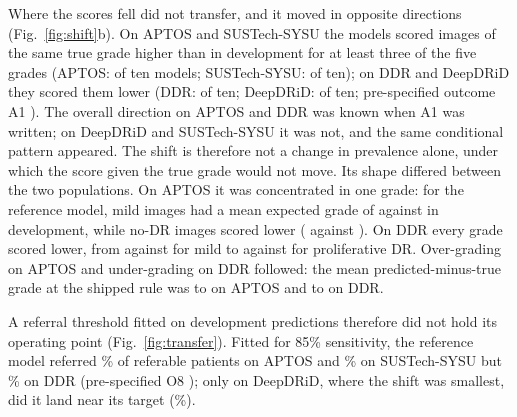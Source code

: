 Where the scores fell did not transfer, and it moved in opposite directions
(Fig.~\ref{fig:shift}b). On APTOS and SUSTech-SYSU the models scored images of the same true grade
higher than in development for at least three of the five grades (APTOS: 
of ten models; SUSTech-SYSU:  of ten); on DDR and DeepDRiD they scored them
lower (DDR:  of ten; DeepDRiD:  of ten; pre-specified
outcome A1 ). The overall direction on APTOS and DDR was known when A1 was written; on DeepDRiD
and SUSTech-SYSU it was not, and the same conditional pattern appeared. The shift is therefore not a
change in prevalence alone, under which the score given the true grade would not move. Its shape differed between the two populations. On
APTOS it was concentrated in one grade: for the reference model, mild images had a mean expected
grade of  against  in development, while no-DR images
scored lower ( against ). On DDR every grade scored lower,
from  against  for mild to  against
 for proliferative DR. Over-grading on APTOS and under-grading on DDR followed:
the mean predicted-minus-true grade at the shipped rule was  to
 on APTOS and  to  on DDR.

A referral threshold fitted on development predictions therefore did not hold its operating
point (Fig.~\ref{fig:transfer}). Fitted for 85\% sensitivity, the reference model referred
\% of referable patients on APTOS and \% on
SUSTech-SYSU but \% on DDR (pre-specified O8 ); only on DeepDRiD,
where the shift was smallest, did it land near its target (\%).

